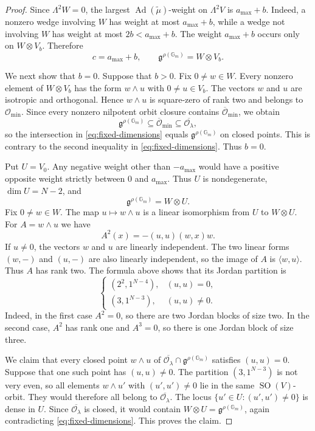 \documentclass[10pt,a4paper]{amsart}
\newcommand{\Gm}{\mathbb G_m}
\begin{document}
\begin{proof}
Since $\Lambda^2W=0$, the largest
$\operatorname{Ad}(\widetilde\mu)$-weight on $\Lambda^2V$ is
$a_{\max}+b$. Indeed, a nonzero wedge involving $W$ has weight at
most $a_{\max}+b$, while a wedge not involving $W$ has weight at most
$2b<a_{\max}+b$. The weight $a_{\max}+b$ occurs only on
$W\otimes V_b$. Therefore
\[
c=a_{\max}+b,
\qquad
\mathfrak g^{\rho(\Gm)}=W\otimes V_b.
\]

We next show that $b=0$. Suppose that $b>0$. Fix $0\ne w\in W$.
Every nonzero element of $W\otimes V_b$ has the form $w\wedge u$
with $0\ne u\in V_b$.
The vectors $w$ and $u$ are isotropic and orthogonal. Hence
$w\wedge u$ is square-zero of rank two and belongs to
$\mathcal O_{\min}$. Since every nonzero nilpotent orbit closure
contains $\overline{\mathcal O}_{\min}$, we obtain
\[
\mathfrak g^{\rho(\Gm)}
\subseteq\overline{\mathcal O}_{\min}
\subseteq\overline{\mathcal O_\lambda},
\]
so the intersection in \eqref{eq:fixed-dimensions} equals
$\mathfrak g^{\rho(\Gm)}$ on closed points. This is contrary to the
second inequality in \eqref{eq:fixed-dimensions}. Thus $b=0$.

Put $U=V_0$. Any negative weight other than $-a_{\max}$ would
have a positive opposite weight strictly between $0$ and $a_{\max}$.
Thus $U$ is nondegenerate, $\dim U=N-2$, and
\[
\mathfrak g^{\rho(\Gm)}=W\otimes U.
\]
Fix $0\ne w\in W$. The map $u\mapsto w\wedge u$ is a linear
isomorphism from $U$ to $W\otimes U$. For $A=w\wedge u$ we have
\[
A^2(x)=-(u,u)(w,x)w.
\]
If $u\ne0$, the vectors $w$ and $u$ are linearly independent. The
two linear forms $(w,-)$ and $(u,-)$ are also linearly independent,
so the image of $A$ is $\langle w,u\rangle$. Thus $A$ has rank two.
The formula above shows that its Jordan partition is
\[
\begin{cases}
(2^2,1^{N-4}),& (u,u)=0,\\
(3,1^{N-3}),& (u,u)\ne0.
\end{cases}
\]
Indeed, in the first case $A^2=0$, so there are two Jordan blocks of
size two. In the second case, $A^2$ has rank one and $A^3=0$, so there
is one Jordan block of size three.

We claim that every closed point $w\wedge u$ of
$\overline{\mathcal O_\lambda}\cap\mathfrak g^{\rho(\Gm)}$
satisfies $(u,u)=0$. Suppose that one such point has $(u,u)\ne0$.
The partition $(3,1^{N-3})$ is not very even, so all elements
$w\wedge u'$ with $(u',u')\ne0$ lie in the same
$\operatorname{SO}(V)$-orbit. They would therefore all belong to
$\overline{\mathcal O_\lambda}$. The locus
$\{u'\in U:(u',u')\ne0\}$ is dense in $U$. Since
$\overline{\mathcal O_\lambda}$ is closed, it would contain
$W\otimes U=\mathfrak g^{\rho(\Gm)}$, again contradicting
\eqref{eq:fixed-dimensions}. This proves the claim.


\end{proof}
\end{document}
